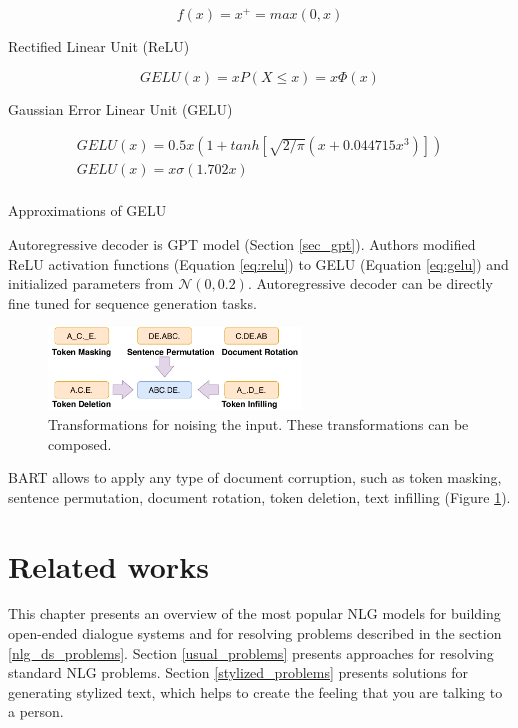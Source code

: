 \begin{eqfloat}
\begin{equation} \label{eq:relu}
f(x) = x^+ = max(0, x)
\end{equation}
\caption{Rectified Linear Unit (ReLU)}
\end{eqfloat}

\begin{eqfloat}
\begin{equation} \label{eq:gelu}
GELU(x) = xP(X \leq x) = x \Phi(x)
\end{equation}
\caption{Gaussian Error Linear Unit (GELU)}
\end{eqfloat}

\begin{eqfloat}
\begin{equation} \label{eq:gelu_approx}
\begin{array}{lcl} 
GELU(x) = 0.5x(1 + tanh[\sqrt{2/\pi}(x + 0.044715x^3)]) \\ 
GELU(x) = x\sigma(1.702x) \\
\end{array}
\end{equation}
\caption{Approximations of GELU}
\end{eqfloat}
Autoregressive decoder is GPT model (Section \ref{sec_gpt}). Authors modified ReLU activation functions (Equation \ref{eq:relu}) to GELU (Equation \ref{eq:gelu}) and initialized parameters from $\mathcal{N}(0, 0.2)$. Autoregressive decoder can be directly fine tuned for sequence generation tasks.

\begin{figure}[hbt]
  \centering
  \includegraphics[width=0.6\textwidth]{figures/bart_doc_corruptions.pdf}
  \caption{Transformations for noising the input. These transformations can be composed.}
  \label{bart_doc_corruption}
\end{figure}

BART allows to apply any type of document corruption, such as token masking, sentence permutation, document rotation, token deletion, text infilling (Figure \ref{bart_doc_corruption}).

\chapter{Related works}
This chapter presents an overview of the most popular NLG models for building open-ended dialogue systems and for resolving problems described in the section \ref{nlg_ds_problems}. Section \ref{usual_problems} presents approaches for resolving standard NLG problems. Section \ref{stylized_problems} presents solutions for generating stylized text, which helps to create the feeling that you are talking to a person.

